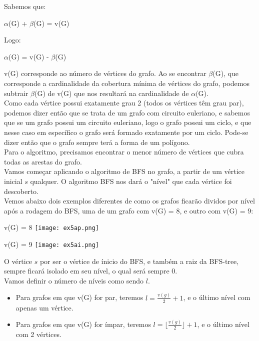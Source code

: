 \documentclass[12pt]{article}
\begin{document}
Sabemos que:
\begin{center}
    $\alpha$(G) + $\beta$(G) = v(G)
\end{center}
Logo:

\begin{center}
    $\alpha$(G) = v(G) - $\beta$(G)
\end{center}

v(G) corresponde ao número de vértices do grafo. Ao se encontrar $\beta$(G), que corresponde a cardinalidade da cobertura mínima de vértices do grafo, podemos subtrair $\beta$(G) de v(G) que nos resultará na cardinalidade de $\alpha$(G).\\

Como cada vértice possui exatamente grau 2 (todos os vértices têm grau par), podemos dizer então que se trata de um grafo com circuito euleriano, e sabemos que se um grafo possui um circuito euleriano, logo o grafo possui um ciclo, e que nesse caso em específico o grafo será formado exatamente por um ciclo. Pode-se dizer então que o grafo sempre terá a forma de um polígono. \\

Para o algoritmo, precisamos encontrar o menor número de vértices que cubra todas as arestas do grafo. \\

Vamos começar aplicando o algoritmo de BFS no grafo, a partir de um vértice inicial $s$ qualquer. O algoritmo BFS nos dará o "nível" que cada vértice foi descoberto.\\

Vemos abaixo dois exemplos diferentes de como os grafos ficarão dividos por nível após a rodagem do BFS, uma de um grafo com v(G) = 8, e outro com v(G) = 9: 

\begin{center}
v(G) = 8
    \texttt{[image: ex5ap.png]}
\end{center}

\begin{center}
v(G) = 9
    \texttt{[image: ex5ai.png]}
\end{center}
O vértice $s$ por ser o vértice de ínicio do BFS, e também a raiz da BFS-tree, sempre ficará isolado em seu nível, o qual será sempre 0.\\
Vamos definir o número de níveis como sendo $l$.
\begin{itemize}
    \item Para grafos em que v(G) for par, teremos $l = \frac{v(g)}{2} + 1$, e o último nível com apenas um vértice.
    \item Para grafos em que v(G) for ímpar, teremos $l = \lfloor\frac{v(g)}{2}\rfloor + 1$, e o último nível com 2 vértices.
\end{itemize}
\end{document}
